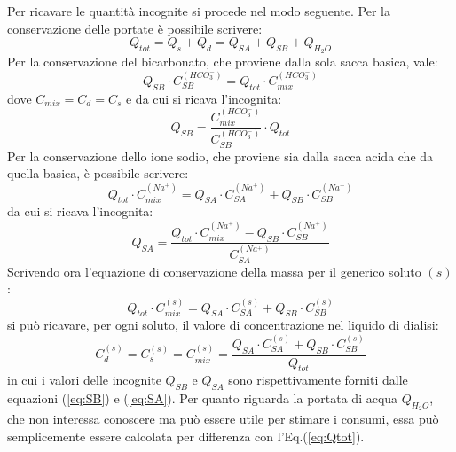 Per ricavare le quantità incognite si procede nel modo seguente. Per la conservazione delle portate è possibile scrivere:
\begin{equation}
	Q_{tot} = Q_s + Q_d = Q_{SA} + Q_{SB} + Q_{H_2O}
	\label{eq:Qtot}
\end{equation}
Per la conservazione del bicarbonato, che proviene dalla sola sacca basica, vale:
\begin{equation}
	Q_{SB}\cdot C_{SB}^{(HCO_3^-)} = Q_{tot}\cdot C_{mix}^{(HCO_3^-)}
\end{equation}
dove $C_{mix} = C_d = C_s$ e da cui si ricava l'incognita:
\begin{equation}
	Q_{SB} = \frac{C_{mix}^{(HCO_3^-)}}{C_{SB}^{(HCO_3^-)}}\cdot Q_{tot}
	\label{eq:SB}
\end{equation}
Per la conservazione dello ione sodio, che proviene sia dalla sacca acida che da quella basica, è possibile scrivere:
\begin{equation}
	Q_{tot}\cdot C_{mix}^{(Na^+)} = Q_{SA}\cdot C_{SA}^{(Na^+)} + Q_{SB}\cdot C_{SB}^{(Na^+)}
\end{equation}
da cui si ricava l'incognita:
\begin{equation}
	Q_{SA}= \frac{Q_{tot}\cdot C_{mix}^{(Na^+)} - Q_{SB}\cdot C_{SB}^{(Na^+)}}{C_{SA}^{(Na^+)}}
	\label{eq:SA}
\end{equation}
Scrivendo ora l'equazione di conservazione della massa per il generico soluto $(s)$:
\begin{equation}
	Q_{tot}\cdot C_{mix}^{(s)} = Q_{SA}\cdot C_{SA}^{(s)} + Q_{SB}\cdot C_{SB}^{(s)}
\end{equation}
si può ricavare, per ogni soluto, il valore di concentrazione nel liquido di dialisi:
\begin{equation}
	C_d^{(s)} = C_s^{(s)} = C_{mix}^{(s)} = \frac{Q_{SA}\cdot C_{SA}^{(s)} + Q_{SB}\cdot C_{SB}^{(s)}}{Q_{tot}}
	\label{eq:liquido}
\end{equation}
in cui i valori delle incognite $Q_{SB}$ e $Q_{SA}$ sono rispettivamente forniti dalle equazioni (\ref{eq:SB}) e (\ref{eq:SA}). Per quanto riguarda la portata di acqua $Q_{H_2O}$, che non interessa conoscere ma può essere utile per stimare i consumi, essa può semplicemente essere calcolata per differenza con l'Eq.(\ref{eq:Qtot}).
